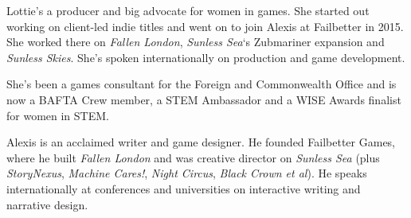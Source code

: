 Lottie’s a producer and big advocate for women in games. She started out working on client-led indie titles and went on to join Alexis at Failbetter in 2015. She worked there on \emph{Fallen London}, \emph{Sunless Sea}‘s Zubmariner expansion and \emph{Sunless Skies}. She’s spoken internationally on production and game development.

She’s been a games consultant for the Foreign and Commonwealth Office and is now a BAFTA Crew member, a STEM Ambassador and a WISE Awards finalist for women in STEM.

Alexis is an acclaimed writer and game designer. He founded Failbetter Games, where he built \emph{Fallen London} and was creative director on \emph{Sunless Sea} (plus \emph{StoryNexus}, \emph{Machine Cares!}, \emph{Night Circus}, \emph{Black Crown et al}). He speaks internationally at conferences and universities on interactive writing and narrative design.
